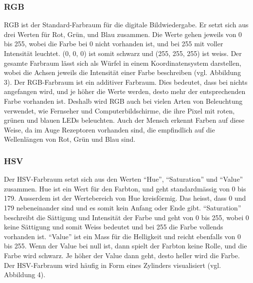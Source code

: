 \documentclass[a4paper, 12pt]{article}
\begin{document}
\subsubsection{RGB}
RGB ist der Standard-Farbraum für die digitale Bildwiedergabe. Er setzt sich aus drei Werten für Rot, Grün, und Blau zusammen. Die Werte gehen jeweils von 0 bis 255, wobei die Farbe bei 0 nicht vorhanden ist, und bei 255 mit voller Intensität leuchtet. (0, 0, 0) ist somit schwarz und (255, 255, 255) ist weiss. Der gesamte Farbraum lässt sich als Würfel in einem Koordinatensystem darstellen, wobei die Achsen jeweils die Intensität einer Farbe beschreiben (vgl. Abbildung 3).
\newpage
\noindent
Der RGB-Farbraum ist ein additiver Farbraum. Dies bedeutet, dass bei nichts angefangen wird, und je höher die Werte werden, desto mehr der entsprechenden Farbe vorhanden ist. \cite{RGBHSV}
\newline 
Deshalb wird RGB auch bei vielen Arten von Beleuchtung verwendet, wie Fernseher und Computerbildschirme, die ihre Pixel mit roten, grünen und blauen LEDs beleuchten. Auch der Mensch erkennt Farben auf diese Weise, da im Auge Rezeptoren vorhanden sind, die empfindlich auf die Wellenlängen von Rot, Grün und Blau sind.
\subsubsection{HSV}
Der HSV-Farbraum setzt sich aus den Werten "`Hue"', "`Saturation"' und "`Value"' zusammen. Hue ist ein Wert für den Farbton, und geht standardmässig von 0 bis 179. Ausserdem ist der Wertebereich von Hue kreisförmig. Das heisst, dass 0 und 179 nebeneinander sind und es somit kein Anfang oder Ende gibt.
\newline
"`Saturation"' beschreibt die Sättigung und Intensität der Farbe und geht von 0 bis 255, wobei 0 keine Sättigung und somit Weiss bedeutet und bei 255 die Farbe vollends vorhanden ist.
\newline
"`Value"' ist ein Mass für die Helligkeit und reicht ebenfalls von 0 bis 255. Wenn der Value bei null ist, dann spielt der Farbton keine Rolle, und die Farbe wird schwarz. Je höher der Value dann geht, desto heller wird die Farbe. \cite{RGBHSV}
\newline
Der HSV-Farbraum wird häufig in Form eines Zylinders visualisiert (vgl. Abbildung 4).
\end{document}
